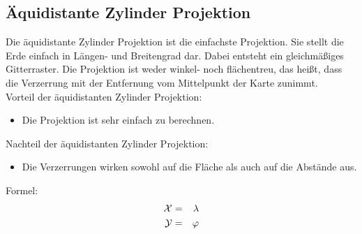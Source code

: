 \subsection{Äquidistante Zylinder Projektion}
\label{sec:aequizylinder} 
Die äquidistante Zylinder Projektion ist die einfachste Projektion. Sie stellt die Erde einfach in Längen- und Breitengrad dar. Dabei entsteht ein gleichmäßiges Gitterraster. Die Projektion ist weder winkel- noch flächentreu, das heißt, dass die Verzerrung mit der Entfernung vom Mittelpunkt der Karte zunimmt.\\ 
Vorteil der äquidistanten Zylinder Projektion:
\begin{itemize}
\item Die Projektion ist sehr einfach zu berechnen.
\end{itemize}
Nachteil der äquidistanten Zylinder Projektion:\\
\begin{itemize}
\item Die Verzerrungen wirken sowohl auf die Fläche als auch auf die Abstände aus.
\end{itemize}

Formel:\\
\begin{eqnarray}
\cal{X} & = & \lambda\\
\cal{Y} & = & \varphi
\end{eqnarray}